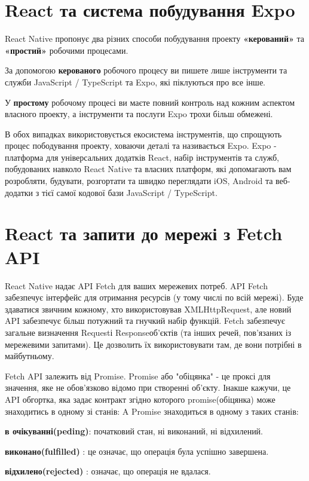 \section{React та система побудування Expo}
\label{sec:rn_expo}
React Native пропонує два різних способи побудування проекту \textbf{«керований»} та \textbf{«простий»} робочими процесами.
\begin{itemize}
    \begin{item}
        За допомогою \textbf{керованого} робочого процесу ви пишете лише інструменти та служби JavaScript / TypeScript та Expo, які піклуються про все інше.
    \end{item}
    \begin{item}
        У \textbf{простому} робочому процесі ви маєте повний контроль над кожним аспектом власного проекту, а інструменти та послуги Expo трохи більш обмежені.
    \end{item}
\end{itemize}

В обох випадках використовується екосистема інструментів, що спрощують процес пободування проекту, ховаючи деталі та називається Expo.
Expo - платформа для універсальних додатків React, набір інструментів та служб, побудованих навколо React Native та власних платформ, які допомагають вам розробляти, будувати, розгортати та швидко переглядати iOS, Android та веб-додатки з тієї самої кодової бази JavaScript / TypeScript.\cite{expo_doc}


\section{React та запити до мережі з Fetch API}
\label{sec:rn_fetch_api}
React Native надає API Fetch для ваших мережевих потреб.
API Fetch забезпечує інтерфейс для отримання ресурсів (у тому числі по всій мережі).
Буде здаватися звичним кожному, хто використовував XMLHttpRequest, але новий API забезпечує більш потужний та гнучкий набір функцій.
Fetch забезпечує загальне визначення Requestі Responseоб'єктів (та інших речей, пов'язаних із мережевими запитами).
Це дозволить їх використовувати там, де вони потрібні в майбутньому.

Fetch API залежить від Promise.
Promise або "обіцянка" - це проксі для значення, яке не обов'язково відомо при створенні об'єкту.\cite{promise_doc}
Інакше кажучи, це API обгортка, яка задає контракт згідно которого promise(обіцянка) може знаходитись в одному зі станів:
A Promise знаходиться в одному з таких станів:
\begin{itemize}
    \begin{item}
        \textbf{в очікуванні(peding)}: початковий стан, ні виконаний, ні відхилений.
    \end{item}
    \begin{item}
        \textbf{виконано(fulfilled)} : це означає, що операція була успішно завершена.
    \end{item}
    \begin{item}
        \textbf{відхилено(rejected)} : означає, що операція не вдалася.
    \end{item}
\end{itemize}

